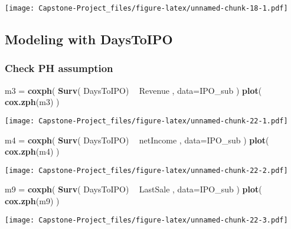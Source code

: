 \documentclass[]{article}
\newenvironment{Shaded}{\begin{snugshade}}{\end{snugshade}}
\newcommand{\DataTypeTok}[1]{\textcolor[rgb]{0.13,0.29,0.53}{#1}}
\newcommand{\KeywordTok}[1]{\textcolor[rgb]{0.13,0.29,0.53}{\textbf{#1}}}
\newcommand{\NormalTok}[1]{#1}
\newcommand{\OperatorTok}[1]{\textcolor[rgb]{0.81,0.36,0.00}{\textbf{#1}}}
\newcommand{\StringTok}[1]{\textcolor[rgb]{0.31,0.60,0.02}{#1}}
\begin{document}
\texttt{[image: Capstone-Project\_files/figure-latex/unnamed-chunk-18-1.pdf]}

\hypertarget{modeling-with-daystoipo}{%
\subsection{Modeling with DaysToIPO}\label{modeling-with-daystoipo}}

\hypertarget{check-ph-assumption}{%
\subsubsection{Check PH assumption}\label{check-ph-assumption}}

\begin{Shaded}
\begin{Highlighting}[]
\NormalTok{m3 =}\StringTok{ }\KeywordTok{coxph}\NormalTok{( }\KeywordTok{Surv}\NormalTok{( DaysToIPO) }\OperatorTok{~}\StringTok{ }\NormalTok{Revenue , }\DataTypeTok{data=}\NormalTok{IPO_sub )}
\KeywordTok{plot}\NormalTok{( }\KeywordTok{cox.zph}\NormalTok{(m3) )}
\end{Highlighting}
\end{Shaded}

\texttt{[image: Capstone-Project\_files/figure-latex/unnamed-chunk-22-1.pdf]}

\begin{Shaded}
\begin{Highlighting}[]
\NormalTok{m4 =}\StringTok{ }\KeywordTok{coxph}\NormalTok{( }\KeywordTok{Surv}\NormalTok{( DaysToIPO) }\OperatorTok{~}\StringTok{ }\NormalTok{netIncome , }\DataTypeTok{data=}\NormalTok{IPO_sub )}
\KeywordTok{plot}\NormalTok{( }\KeywordTok{cox.zph}\NormalTok{(m4) )}
\end{Highlighting}
\end{Shaded}

\texttt{[image: Capstone-Project\_files/figure-latex/unnamed-chunk-22-2.pdf]}

\begin{Shaded}
\begin{Highlighting}[]
\NormalTok{m9 =}\StringTok{ }\KeywordTok{coxph}\NormalTok{( }\KeywordTok{Surv}\NormalTok{( DaysToIPO) }\OperatorTok{~}\StringTok{ }\NormalTok{LastSale , }\DataTypeTok{data=}\NormalTok{IPO_sub )}
\KeywordTok{plot}\NormalTok{( }\KeywordTok{cox.zph}\NormalTok{(m9) )}
\end{Highlighting}
\end{Shaded}

\texttt{[image: Capstone-Project\_files/figure-latex/unnamed-chunk-22-3.pdf]}
\end{document}

